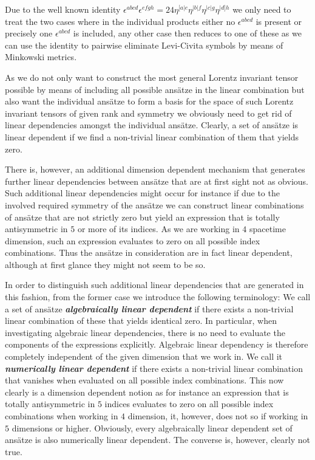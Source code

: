 \documentclass[a4paper,12pt, DIV=14, BCOR=5mm, twoside, headsepline, numbers=noenddot]{scrbook}
\begin{document}
Due to the well known identity $\epsilon^{abcd}\epsilon^{efgh} = 24 \eta^{[a\vert e}\eta^{\vert b \vert f}\eta^{\vert c \vert g}\eta^{\vert d] h}$ we only need to treat the two cases where in the individual products either no $\epsilon^{abcd}$ is present or precisely one $\epsilon^{abcd}$ is included, any other case then reduces to one of these as we can use the identity to pairwise eliminate Levi-Civita symbols by means of Minkowski metrics. 

As we do not only want to construct the most general Lorentz invariant tensor possible by means of including all possible ansätze in the linear combination but also want the individual ansätze to form a basis for the space of such Lorentz invariant tensors of given rank and symmetry we obviously need to get rid of linear dependencies amongst the individual ansätze. Clearly, a set of ansätze is linear dependent if we find a non-trivial linear combination of them that yields zero. 

There is, however, an additional dimension dependent mechanism that generates further linear dependencies between ansätze that are at first sight not as obvious. Such additional linear dependencies might occur for instance if due to the involved required symmetry of the ansätze we can construct linear combinations of ansätze that are not strictly zero but yield an expression that is totally antisymmetric in $5$ or more of its indices. As we are working in $4$ spacetime dimension, such an expression evaluates to zero on all possible index combinations. Thus the ansätze in consideration are in fact linear dependent, although at first glance they might not seem to be so. 

In order to distinguish such additional linear dependencies that are generated in this fashion, from the former case we introduce the following terminology: We call a set of ansätze \textit{\textbf{algebraically linear dependent}} if there exists a non-trivial linear combination of these that yields identical zero. In particular, when investigating algebraic linear dependencies, there is no need to evaluate the components of the expressions explicitly. Algebraic linear dependency is therefore completely independent of the given dimension that we work in. We call it \textbf{\textit{numerically linear dependent}} if there exists a non-trivial linear combination that vanishes when evaluated on all possible index combinations. This now clearly is a dimension dependent notion as for instance an expression that is totally antisymmetric in $5$ indices evaluates to zero on all possible index combinations when working in $4$ dimension, it, however, does not so if working in $5$ dimensions or higher. Obviously, every algebraically linear dependent set of ansätze is also numerically linear dependent. The converse is, however, clearly not true. 
\end{document}
